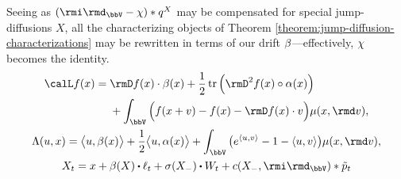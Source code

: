 Seeing as $(\id_\vecSpace - \trunc) \ast \jumpMeas^\X$ may be compensated for special jump-diffusions $X$, all the characterizing objects of Theorem \ref{theorem:jump-diffusion-characterizations} may be rewritten in terms of our drift $\beta$---effectively, $\chi$ becomes the identity.
\begin{gather*}
  \generator f(\stateVar)= \begin{aligned}[t]
    &\Der f(\stateVar) \cdot \affDrift(\stateVar) 
    + \frac12 \tr\Big( \Hess f(\stateVar) \circ \affDiff(\stateVar) \Big) \\
    &+ \int_\vecSpace \Big( f(\stateVar + \markVar) - f(\stateVar) - \Der f(\stateVar) \cdot \markVar \Big) \affJump(\stateVar, \rmd\markVar),
  \end{aligned}\\
  \ode(\momentVar, \stateVar) = \bprj{\momentVar}{\affDrift(\stateVar)} + \frac12\bprj{\momentVar}{\affDiff(\stateVar)} + \int_\vecSpace \big( e^\prj{\momentVar}{\markVar} - 1 - \prj{\momentVar}{\markVar} \big) \affJump(\stateVar, \rmd\markVar), \\
  \X_t = \stateVar + \affDrift(\X) \shortInt \leb_t + \sigma(\X_-) \shortInt \W_t + \thinner(\X_-, \id_\vecSpace) \ast \compensate{\poisRM}_t 
\end{gather*}

